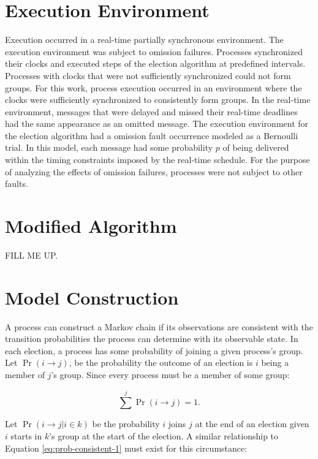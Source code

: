 \section{Execution Environment}

Execution occurred in a real-time partially synchronous environment.
The execution environment was subject to omission failures.
Processes synchronized their clocks and executed steps of the election algorithm at predefined intervals.
Processes with clocks that were not sufficiently synchronized could not form groups.
For this work, process execution occurred in an environment where the clocks were sufficiently synchronized to consistently form groups.
In the real-time environment, messages that were delayed and missed their real-time deadlines had the same appearance as an omitted message.
The execution environment for the election algorithm had a omission fault occurrence modeled as a Bernoulli trial.
In this model, each message had some probability $p$ of being delivered within the timing constraints imposed by the real-time schedule.
For the purpose of analyzing the effects of omission failures, processes were not subject to other faults.

\section{Modified Algorithm}

FILL ME UP.

\section{Model Construction}

A process can construct a Markov chain if its observations are consistent with the transition probabilities the process can determine with its observable state.
In each election, a process has some probability of joining a given process's group.
Let $\Pr(i \rightarrow j)$, be the probability the outcome of an election is $i$ being a member of $j$'s group.
Since every process must be a member of some group:

\begin{equation}
\sum^{j} \Pr(i \rightarrow j) = 1.
\label{eq:prob-consistent-1}
\end{equation}

Let $\Pr(i \rightarrow j | i \in k)$ be the probability $i$ joins $j$ at the end of an election given $i$ starts in $k$'s group at the start of the election.
A similar relationship to Equation \ref{eq:prob-consistent-1} must exist for this circumstance:

